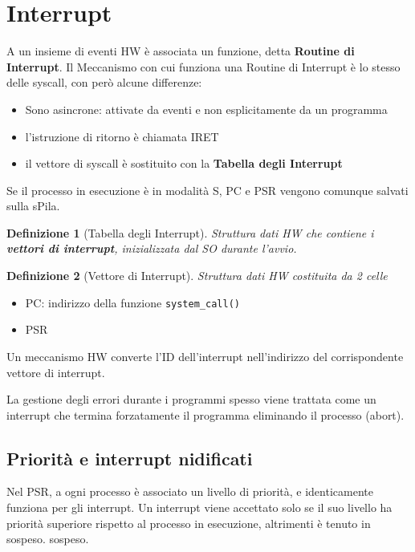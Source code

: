 \documentclass[12pt, a4paper]{report}
\newtheorem{definition}{Definizione}
\begin{document}
\section{Interrupt}
A un insieme di eventi HW è associata un funzione, detta \textbf{Routine di
Interrupt}. Il Meccanismo con cui funziona una Routine di Interrupt è lo
stesso delle syscall, con però alcune differenze:
\begin{itemize}
	\item Sono asincrone: attivate da eventi e non esplicitamente da un
		programma
	\item l'istruzione di ritorno è chiamata IRET
	\item il vettore di syscall è sostituito con la \textbf{Tabella degli
		Interrupt}
\end{itemize}
Se il processo in esecuzione è in modalità S, PC e PSR vengono comunque
salvati sulla sPila.
\begin{definition}[Tabella degli Interrupt]
	Struttura dati HW che contiene i \textbf{vettori di interrupt},
	inizializzata dal SO durante l'avvio.
\end{definition}
\begin{definition}[Vettore di Interrupt]
	Struttura dati HW costituita da 2 celle
\end{definition}
\begin{itemize}
	\item PC: indirizzo della funzione \texttt{system\_call()}
	\item PSR
\end{itemize}
Un meccanismo HW converte l'ID dell'interrupt nell'indirizzo del corrispondente
vettore di interrupt.

La gestione degli errori durante i programmi spesso viene trattata come un
interrupt che termina forzatamente il programma eliminando il processo (abort).

\subsection{Priorità e interrupt nidificati}
Nel PSR, a ogni processo è associato un livello di priorità, e identicamente
funziona per gli interrupt. Un interrupt viene accettato solo se il suo livello
ha priorità superiore rispetto al processo in esecuzione, altrimenti è tenuto
in sospeso. sospeso.
\end{document}
